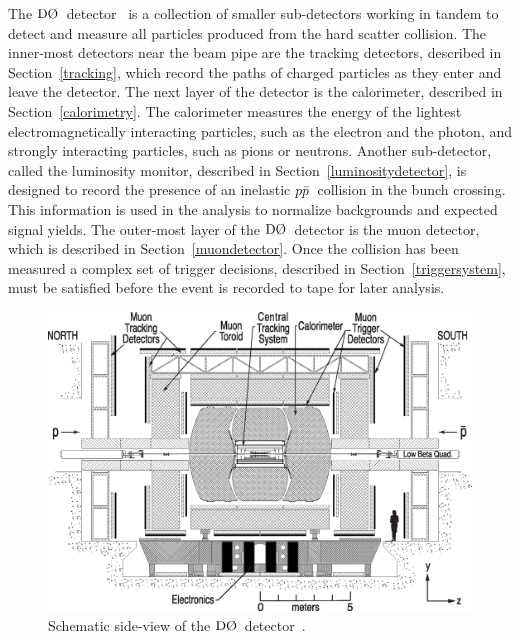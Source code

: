 The $\dzero$~detector~\cite{Abazov:2005pn} is a collection of smaller sub-detectors working in tandem  to detect and measure all particles produced from the hard scatter collision. The inner-most detectors near the beam pipe are the tracking detectors, described in Section~\ref{tracking}, which record the paths of charged particles as they enter and leave the detector. The next layer of the detector is the calorimeter, described in Section~\ref{calorimetry}. The calorimeter measures the energy of the lightest electromagnetically interacting particles, such as the electron and the photon, and strongly interacting particles, such as pions or neutrons. Another sub-detector, called the luminosity monitor, described in Section~\ref{luminositydetector}, is designed to record the presence of an inelastic $\mbox{$p\bar{p}$}$~collision in the bunch crossing. This information is used in the analysis to normalize backgrounds and expected signal yields. The outer-most layer of the $\dzero$~detector is the muon detector, which is described in Section~\ref{muondetector}. Once the collision has been measured a complex set of trigger decisions, described in Section~\ref{triggersystem}, must be satisfied before the event is recorded to tape for later analysis.

\begin{figure}[!h!tbp]
\begin{center}
\includegraphics[width=1.0\textwidth]{eps/D0/DetectorSlice.eps}
\end{center}
\vspace{-0.1in}
\caption{Schematic side-view of the $\dzero$~detector~\cite{Abazov:2005pn}.}
\label{D0}
\end{figure}

